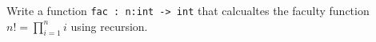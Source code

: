 Write a function \lstinline{fac : n:int -> int} that calcualtes the faculty function $n! = \prod_{i=1}^ni$ using recursion.
